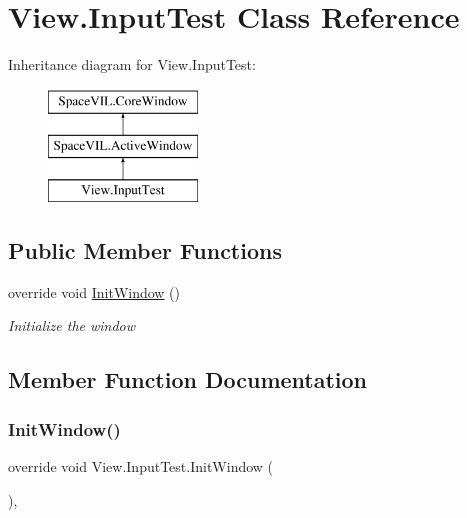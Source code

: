 \hypertarget{class_view_1_1_input_test}{}\section{View.\+Input\+Test Class Reference}
\label{class_view_1_1_input_test}
Inheritance diagram for View.\+Input\+Test\+:\begin{figure}[H]
\begin{center}
\leavevmode
\includegraphics[height=3.000000cm]{class_view_1_1_input_test}
\end{center}
\end{figure}
\subsection*{Public Member Functions}
\begin{DoxyCompactItemize}
\item 
override void \mbox{\hyperlink{class_view_1_1_input_test_a9887db9b33135e82710ac4c02ffcec52}{Init\+Window}} ()
\begin{DoxyCompactList}\small\item\em Initialize the window \end{DoxyCompactList}\end{DoxyCompactItemize}


\subsection{Member Function Documentation}
\mbox{\label{class_view_1_1_input_test_a9887db9b33135e82710ac4c02ffcec52}} 
\subsubsection{\texorpdfstring{Init\+Window()}{InitWindow()}}
{\footnotesize\ttfamily override void View.\+Input\+Test.\+Init\+Window (\begin{DoxyParamCaption}{ }\end{DoxyParamCaption})\hspace{0.3cm}{\ttfamily [inline]}, {\ttfamily [virtual]}}



